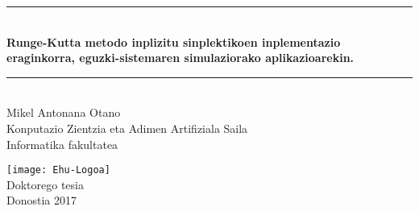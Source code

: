 \begin{titlepage}
\newcommand{\HRule}{\rule{\linewidth}{0.5mm}}
\begin{center}
\HRule \\[0.4cm]
{ \Large \bfseries \sc Runge-Kutta metodo inplizitu sinplektikoen inplementazio eraginkorra, eguzki-sistemaren simulaziorako aplikazioarekin.}\\[0.4cm]



\HRule \\[1cm]
{\Large Mikel Antonana Otano}
\\[.75cm]


{\large Konputazio Zientzia eta Adimen Artifiziala Saila \\[.1cm]
}
{\large Informatika fakultatea \\[2.cm]
}


\texttt{[image: Ehu-Logoa]}
\\[5cm]

{\large Doktorego tesia\\[.1cm]}
{\large Donostia 2017}




\end{center}
\end{titlepage}\pagebreak